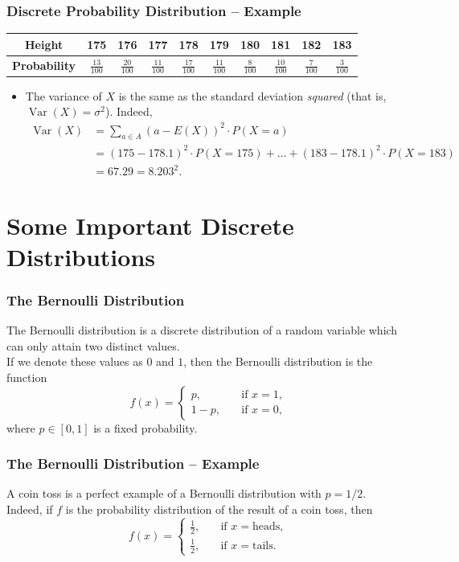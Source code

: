 \documentclass[aspectratio=169,11pt,usenames,dvipsnames,handout]{beamer}
\DeclareMathOperator{\var}{Var}
\begin{document}
\begin{frame}
 \frametitle{Discrete Probability Distribution -- Example}
 \begin{center}
  \begin{tabular}{c|ccccccccc}
   \textbf{Height} & 175 & 176 & 177 & 178 & 179 & 180 & 181 & 182 & 183\\
   \midrule
   \textbf{Probability} & $\frac{13}{100}$ & $\frac{20}{100}$ & $\frac{11}{100}$
                        & $\frac{17}{100}$ & $\frac{11}{100}$ & $\frac{8}{100}$
                        & $\frac{10}{100}$ & $\frac{7}{100}$ & $\frac{3}{100}$
  \end{tabular}
 \end{center}
 \begin{itemize}
  \item The \alert{variance} of $X$ is the same as the standard deviation
   \emph{squared} (that is, $\var(X) = \sigma^2$). Indeed,
   \begin{align*}
    \var(X) &= \sum_{a \in A} (a - E(X))^2 \cdot P(X = a)\\
            &= (175 - 178.1)^2 \cdot P(X = 175) + \ldots + (183 - 178.1)^2 \cdot
            P(X = 183)\\
            &= 67.29 = 8.203^2.
   \end{align*}
 \end{itemize}
\end{frame}

\section{Some Important Discrete Distributions}

\begin{frame}
 \frametitle{The Bernoulli Distribution}
 The \alert{Bernoulli} distribution is a discrete distribution of a random
 variable which can only attain \alert{two distinct values}.\\ \pause
 If we denote these values as $0$ and $1$, then the Bernoulli distribution is
 the function
 \[
  f(x) = \begin{cases}
   p, \quad &\text{if } x = 1,\\
   1 - p, \quad &\text{if } x = 0,
  \end{cases}
 \]
 where $p \in [0,1]$ is a \alert{fixed} probability.
\end{frame}

\begin{frame}
 \frametitle{The Bernoulli Distribution -- Example}
 A \alert{coin toss} is a perfect example of a Bernoulli distribution with $p =
 1 / 2$. \\ \pause
 Indeed, if $f$ is the probability distribution of the result of a coin toss,
 then
 \[
  f(x) = 
  \begin{cases}
   \frac{1}{2}, \quad &\text{if } x = \text{heads},\\
   \frac{1}{2}, \quad &\text{if } x = \text{tails}.
  \end{cases}
 \]
\end{frame}
\end{document}
